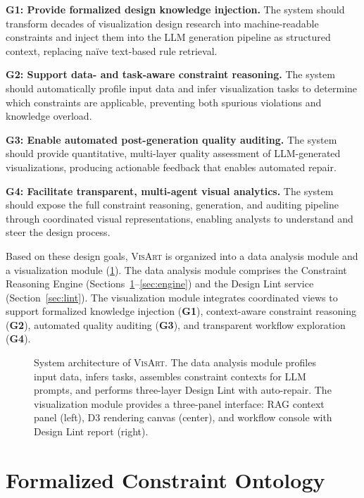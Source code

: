 \documentclass[final,5p,times,twocolumn]{elsarticle}
\newcommand{\sysname}{\textsc{VisArt}}
\begin{document}
\textbf{G1: Provide formalized design knowledge injection.}
The system should transform decades of visualization design research into machine-readable constraints and inject them into the LLM generation pipeline as structured context, replacing na\"ive text-based rule retrieval.

\textbf{G2: Support data- and task-aware constraint reasoning.}
The system should automatically profile input data and infer visualization tasks to determine which constraints are applicable, preventing both spurious violations and knowledge overload.

\textbf{G3: Enable automated post-generation quality auditing.}
The system should provide quantitative, multi-layer quality assessment of LLM-generated visualizations, producing actionable feedback that enables automated repair.

\textbf{G4: Facilitate transparent, multi-agent visual analytics.}
The system should expose the full constraint reasoning, generation, and auditing pipeline through coordinated visual representations, enabling analysts to understand and steer the design process.

Based on these design goals, \sysname{} is organized into a data analysis module and a visualization module (\cref{fig:architecture}).
The data analysis module comprises the Constraint Reasoning Engine (Sections~\ref{sec:ontology}--\ref{sec:engine}) and the Design Lint service (Section~\ref{sec:lint}).
The visualization module integrates coordinated views to support formalized knowledge injection (\textbf{G1}), context-aware constraint reasoning (\textbf{G2}), automated quality auditing (\textbf{G3}), and transparent workflow exploration (\textbf{G4}).

\begin{figure}[!t]
  \centering
  \caption{%
    System architecture of \sysname{}.
    The data analysis module profiles input data, infers tasks, assembles constraint contexts for LLM prompts, and performs three-layer Design Lint with auto-repair.
    The visualization module provides a three-panel interface: RAG context panel (left), D3 rendering canvas (center), and workflow console with Design Lint report (right).
  }
  \label{fig:architecture}
\end{figure}


\section{Formalized Constraint Ontology}
\label{sec:ontology}
\end{document}
